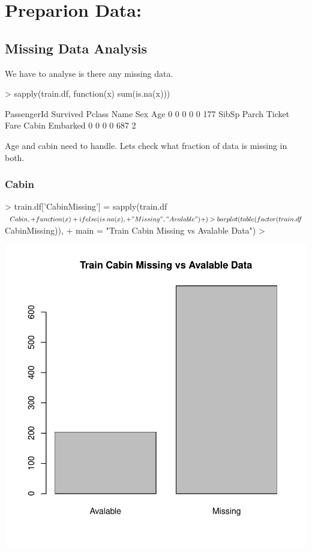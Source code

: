 \documentclass[12pt]{article}
\begin{document}
\section*{Preparion Data:}


\subsection*{Missing Data Analysis }
We have to analyse is there any missing data.
\begin{Schunk}
\begin{Sinput}
> sapply(train.df, function(x) sum(is.na(x)))
\end{Sinput}
\begin{Soutput}
PassengerId    Survived      Pclass        Name         Sex         Age 
          0           0           0           0           0         177 
      SibSp       Parch      Ticket        Fare       Cabin    Embarked 
          0           0           0           0         687           2 
\end{Soutput}
\end{Schunk}

Age and cabin need to handle. Lets check what fraction of data is missing in both.

\subsubsection*{Cabin}
\begin{Schunk}
\begin{Sinput}
> train.df['CabinMissing'] =  sapply(train.df$Cabin, 
+                                    function(x) 
+                                      ifelse(is.na(x),
+                                         "Missing","Avalable")
+                                    )
> barplot(table(factor(train.df$CabinMissing)), 
+         main = "Train Cabin Missing vs Avalable Data")
> 
\end{Sinput}
\end{Schunk}
\includegraphics{Example-004}
\end{document}
